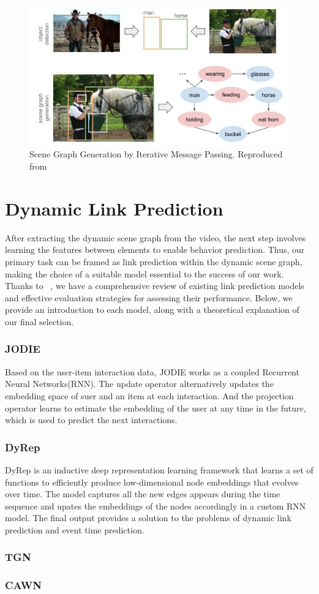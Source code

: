 \begin{figure}
    \centering
    \includegraphics[width=\linewidth]{figures/03_SGG.jpg}
    \caption{Scene Graph Generation by Iterative Message Passing. Reproduced from\cite{tang2020unbiased}}
    \label{fig:SGG}
\end{figure}

\section{Dynamic Link Prediction}

After extracting the dynamic scene graph from the video, the next step involves learning the features between elements to enable behavior prediction. Thus, our primary task can be framed as link prediction within the dynamic scene graph, making the choice of a suitable model essential to the success of our work. Thanks to ~\cite{poursafaei2022towards}, we have a comprehensive review of existing link prediction models and effective evaluation strategies for assessing their performance. Below, we provide an introduction to each model, along with a theoretical explanation of our final selection.

\subsubsection{JODIE}
Based on the user-item interaction data, JODIE\cite{kumar2019predicting} works as a coupled Recurrent Neural Networks(RNN). The update operator alternatively updates the embedding space of suer and an item at each interaction. And the projection operator learns to estimate the embedding of the user at any time in the future, which is used to predict the next interactions. 

\subsubsection{DyRep}
DyRep\cite{trivedi2018representation} is an inductive deep representation learning framework that learns a set of functions to efficiently produce low-dimensional node embeddings that evolves over time. The model captures all the new edges appears during the time sequence and upates the embeddings of the nodes accordingly in a custom RNN model. The final output provides a solution to the problems of dynamic link prediction and event time prediction.
\subsubsection{TGN}
\subsubsection{CAWN}
